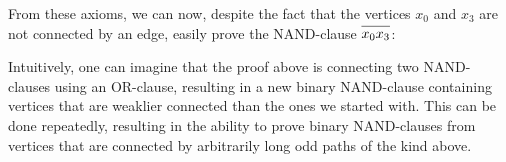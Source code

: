 From these axioms, we can now, despite the fact that the vertices $x_0$ and $x_3$ are not connected by an edge, easily prove the NAND-clause $\ol{x_0x_3}$:\par
\begin{figure}[!h]
  \centering
  \begin{prooftree*}
  \end{prooftree*}
\caption{}
\label{fig:proof_x0x3}
\end{figure}
Intuitively, one can imagine that the proof above is connecting two NAND-clauses using an OR-clause, resulting in a new binary NAND-clause containing vertices that are weaklier connected than the ones we started with.
This can be done repeatedly, resulting in the ability to prove binary NAND-clauses from vertices that are connected by arbitrarily long odd paths of the kind above.

